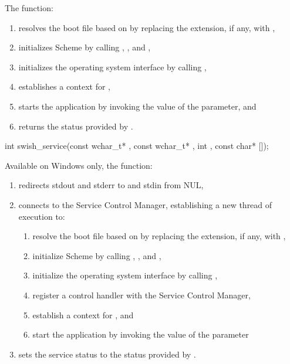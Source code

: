 \begin{function}
\end{function}

The  function:
\begin{enumerate} %
\item resolves the boot file based on
   by replacing the extension, if any, with
  ,
\item initializes Scheme by calling ,
  , and ,
\item initializes the operating system interface by calling ,
\item establishes a context for ,
\item starts the application by invoking the value of the  parameter, and
\item returns the status provided by .
\end{enumerate}

\begin{function}
  \codebegin
int swish\_service(const wchar\_t* , const wchar\_t* ,
                  int , const char* []);
  \codeend
\end{function}

Available on Windows only, the  function:
\begin{enumerate}
\item redirects stdout and stderr to  and stdin from NUL,
\item connects to the Service Control Manager, establishing a
  new thread of execution to:
  \begin{enumerate} %
    \item resolve the boot file based on  by
      replacing the extension, if any, with ,
    \item initialize Scheme by calling ,
      , and ,
    \item initialize the operating system interface by calling ,
    \item register a control handler with the Service Control Manager,
    \item establish a context for , and
    \item start the application by invoking the value of the
       parameter
  \end{enumerate}
\item sets the service status to the status provided by .
\end{enumerate}

